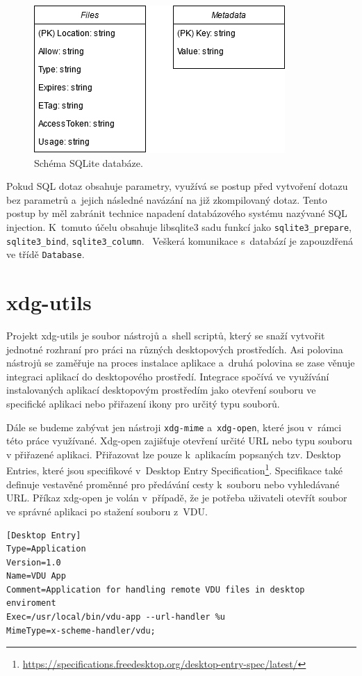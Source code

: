 \begin{figure}[h]
    \centering
    \includegraphics[width=0.6\linewidth]{other-fig/database.png}
    \caption{Schéma SQLite databáze.}
\end{figure}

Pokud SQL dotaz obsahuje parametry, využívá se postup před vytvoření dotazu bez parametrů a jejich následné navázání na již zkompilovaný dotaz. Tento postup by měl zabránit
technice napadení databázového systému nazývané SQL injection. K tomuto účelu obsahuje libsqlite3 sadu funkcí jako \texttt{sqlite3\_prepare}, \texttt{sqlite3\_bind},
\texttt{sqlite3\_column}. \cite{sqlite-c} Veškerá komunikace s databází je zapouzdřená ve třídě \texttt{Database}.

\section{xdg-utils}
Projekt xdg-utils je soubor nástrojů a shell scriptů, který se snaží vytvořit jednotné rozhraní pro práci na různých desktopových prostředích. Asi polovina nástrojů se 
zaměřuje na proces instalace aplikace a druhá polovina se zase věnuje integraci aplikací do desktopového prostředí. Integrace spočívá ve využívání instalovaných aplikací
desktopovým prostředím jako otevření souboru ve specifické aplikaci nebo přiřazení ikony pro určitý typu souborů.

Dále se budeme zabývat jen nástroji \texttt{xdg-mime} a \texttt{xdg-open}, které jsou v rámci této práce využívané. Xdg-open zajišťuje otevření určité URL nebo typu souboru
v přiřazené aplikaci. Přiřazovat lze pouze k aplikacím popsaných tzv. Desktop Entries, které jsou specifikové v Desktop Entry Specification\footnote{\url{https://specifications.freedesktop.org/desktop-entry-spec/latest/}}.
Specifikace také definuje vestavěné proměnné pro předávání cesty k souboru nebo vyhledávané URL. Příkaz xdg-open je volán v případě, že je potřeba uživateli otevřít soubor ve
správné aplikaci po stažení souboru z VDU. \cite{xdg}

\begin{lstlisting}[caption={Příklad struktury Desktop Entry souboru.}]
[Desktop Entry]
Type=Application
Version=1.0
Name=VDU App
Comment=Application for handling remote VDU files in desktop enviroment
Exec=/usr/local/bin/vdu-app --url-handler %u
MimeType=x-scheme-handler/vdu;    
\end{lstlisting}

